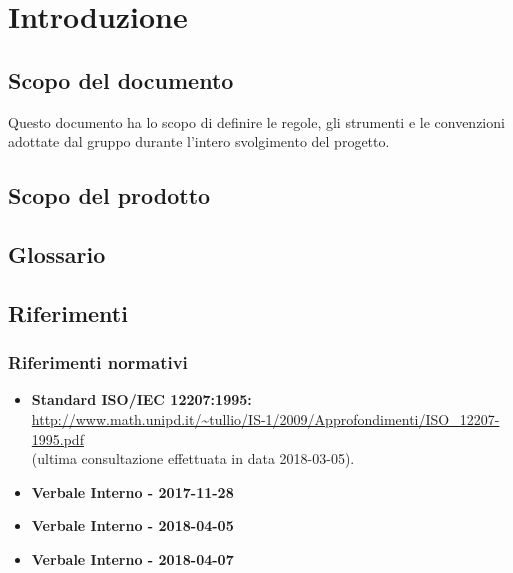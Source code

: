 \section{Introduzione} \label{introduzione}

	\subsection{Scopo del documento}

		Questo documento ha lo scopo di definire le regole, gli strumenti e le convenzioni adottate dal 
		gruppo \GroupName{} durante l'intero svolgimento del progetto.

	\subsection{Scopo del prodotto}

		\ScopoProdotto{}

	\subsection{Glossario}

		\DescrizioneGlossario{}

	\subsection{Riferimenti}

		\subsubsection{Riferimenti normativi}

			\begin{itemize}
				\item
				\textbf{Standard ISO/IEC 12207:1995:}\\
				\url{http://www.math.unipd.it/~tullio/IS-1/2009/Approfondimenti/ISO_12207-1995.pdf} \\
				(ultima consultazione effettuata in data 2018-03-05).
                
				\item
				\textbf{Verbale Interno - 2017-11-28}\\
				
				\item
				\textbf{Verbale Interno - 2018-04-05}\\

				\item
				\textbf{Verbale Interno - 2018-04-07}\\
			\end{itemize}

